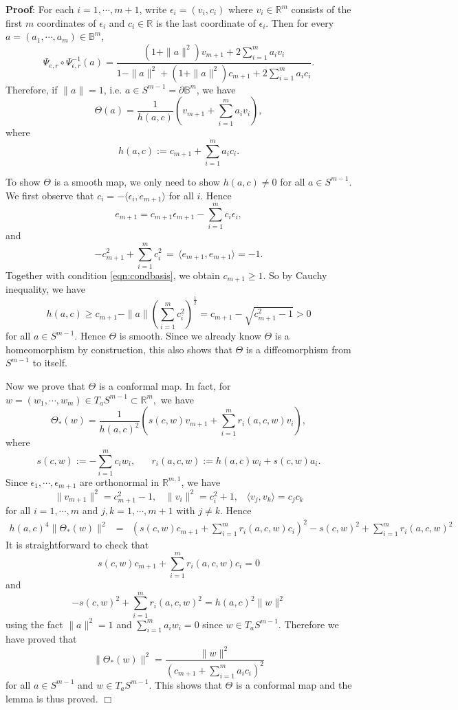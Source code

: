 \documentclass[12pt]{article}
\begin{document}
\noindent
{\bf Proof}:
For each $i=1, \cdots, m+1$, write $\epsilon_i=(v_i, c_i)$ where $v_i \in \mathbb{R}^m$ consists of the first $m$ coordinates of $\epsilon_i$ and $c_i \in \mathbb{R}$ is the last coordinate of $\epsilon_i$. Then for every $a=(a_1, \cdots, a_m) \in {\mathbb{B}^m}$,
\[ \Psi_{e, r} \circ \Psi_{\epsilon, r}^{-1} (a)
=  \frac{(1+\|a\|^2) v_{m+1} +2 \sum_{i=1}^m a_i v_i }{1-\|a\|^2+(1+\|a\|^2) c_{m+1} + 2 \sum_{i=1}^m a_i c_i}.\]
Therefore, if $\|a\|=1$, i.e. $a \in S^{m-1} = \partial {\mathbb{B}^m}$, we have
\begin{equation}
 \Theta (a)
    = \frac{1}{h(a,c)} \left( v_{m+1} + \sum_{i=1}^m a_i v_i \right),
\end{equation}
where
\[ h(a,c) := c_{m+1} +  \sum_{i=1}^m a_i c_i.\]


To show $\Theta$ is a smooth map, we only need to show $h(a,c) \neq 0$ for all $a \in S^{m-1} $.
We first observe that $c_i = - \langle\epsilon_i, e_{m+1}\rangle $ for all $i$. Hence
\[  e_{m+1} = c_{m+1} \epsilon_{m+1} - \sum_{i=1}^m c_i \epsilon_i, \]
and
\[ - c_{m+1}^2 + \sum_{i=1}^m c_i^2 \, = \, \langle e_{m+1}, e_{m+1}\rangle = -1. \]
Together with condition \eqref{eqn:condbasis}, we obtain $c_{m+1} \geq 1$. So
by Cauchy inequality, we have
\[ h(a,c) \geq c_{m+1} - \|a\| \left( \sum_{i=1}^m c_i^2 \right)^{\frac{1}{2}}= c_{m+1} - \sqrt{ c_{m+1}^2 -1} > 0 \]
 for all $a \in S^{m-1}$.
Hence $\Theta$ is smooth. Since we already know $\Theta$ is a homeomorphism by construction, this also shows that
$\Theta$ is a diffeomorphism from $S^{m-1}$ to itself.

Now we prove that $\Theta$  is a conformal map. In fact, for
$w=(w_1, \cdots, w_m) \in T_a S^{m-1} \subset \mathbb{R}^m,$
 we have
\[ \Theta_*(w) = \frac{1}{h(a,c)^2} \left( s(c,w) v_{m+1} + \sum_{i=1}^m  r_i(a, c ,w) v_i \right), \]
where
\[ s(c, w):= - \sum_{i=1}^m c_i w_i, \hspace{20pt} r_i(a, c ,w):= h(a,c) w_i + s(c, w) a_i.\]
Since $\epsilon_1, \cdots, \epsilon_{m+1}$ are orthonormal in $\mathbb{R}^{m,1}$, we have
\[ \|v_{m+1}\|^2 = c_{m+1}^2-1, \hspace{10pt}
\|v_i\|^2 = c_i^2+1, \hspace{10pt}
\langle v_j, v_k\rangle = c_j c_k \]
for all $i = 1, \cdots, m$ and $j, k = 1, \cdots, m+1$ with $j \neq k$.
Hence
\begin{eqnarray*}
 h(a,c)^4 \| \Theta_*(w) \|^2
 &=& \left( s(c,w) c_{m+1} + \sum_{i=1}^m r_i(a,c,w) c_i \right)^2
    - s(c, w)^2 + \sum_{i=1}^m r_i(a,c,w)^2
\end{eqnarray*}
It is straightforward to check that
\[ s(c,w) c_{m+1} + \sum_{i=1}^m r_i(a,c,w) c_i = 0\]
and
\[ - s(c, w)^2 + \sum_{i=1}^m r_i(a,c,w)^2 = h(a,c)^2 \|w\|^2\]
using the fact $\|a\|^2=1$ and $\sum_{i=1}^m a_i w_i = 0$ since $w \in T_a S^{m-1}$.
Therefore we have proved that
\begin{equation}
\|\Theta_*(w) \|^2 = \frac{\|w\|^2}{\left( c_{m+1}+\sum_{i=1}^m a_i c_i \right)^2}
\end{equation}
for all $a \in S^{m-1}$ and $w \in T_a S^{m-1}$.
This shows that $\Theta$ is a conformal map and the lemma is thus proved.
$\Box$
\end{document}
